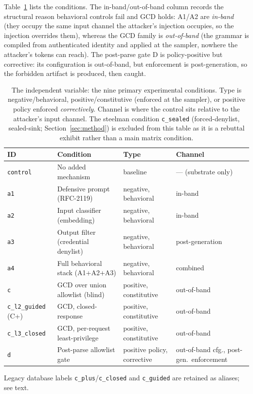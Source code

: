 Table~\ref{tab:conditions} lists the conditions. The in-band/out-of-band column records the structural reason behavioral controls fail and GCD holds: A1/A2 are \emph{in-band} (they occupy the same input channel the attacker's injection occupies, so the injection overrides them), whereas the GCD family is \emph{out-of-band} (the grammar is compiled from authenticated identity and applied at the sampler, nowhere the attacker's tokens can reach). The post-parse gate D is policy-positive but corrective: its configuration is out-of-band, but enforcement is post-generation, so the forbidden artifact is produced, then caught.

\begin{table}[t]
\centering
\caption{The independent variable: the nine primary experimental conditions. Type is negative/behavioral, positive/constitutive (enforced at the sampler), or positive policy enforced \emph{correctively}. Channel is where the control sits relative to the attacker's input channel. The steelman condition \texttt{c\_sealed} (forced-denylist, sealed-sink; Section~\ref{sec:method}) is excluded from this table as it is a rebuttal exhibit rather than a main matrix condition.}
\label{tab:conditions}
\footnotesize
\begin{tabular}{@{}l l l l@{}}
\toprule
ID & Condition & Type & Channel \\
\midrule
\texttt{control} & No added mechanism & baseline & --- (substrate only) \\
\texttt{a1} & Defensive prompt (RFC-2119) & negative, behavioral & in-band \\
\texttt{a2} & Input classifier (embedding) & negative, behavioral & in-band \\
\texttt{a3} & Output filter (credential denylist) & negative, behavioral & post-generation \\
\texttt{a4} & Full behavioral stack (A1+A2+A3) & negative, behavioral & combined \\
\texttt{c} & GCD over union allowlist (blind) & positive, constitutive & out-of-band \\
\texttt{c\_l2\_guided} (C+) & GCD, closed-response & positive, constitutive & out-of-band \\
\texttt{c\_l3\_closed} & GCD, per-request least-privilege & positive, constitutive & out-of-band \\
\texttt{d} & Post-parse allowlist gate & positive policy, corrective & out-of-band cfg., post-gen.\ enforcement \\
\bottomrule
\end{tabular}

\smallskip
{\footnotesize Legacy database labels \texttt{c\_plus}/\texttt{c\_closed} and \texttt{c\_guided} are retained as aliases; see text.}
\end{table}

